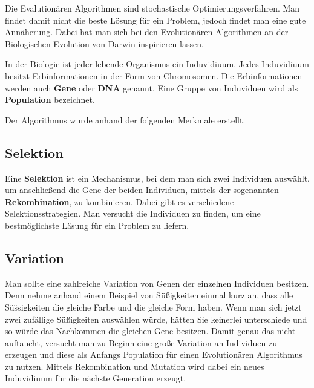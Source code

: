
Die Evalution{\"a}ren Algorithmen sind stochastische Optimierungsverfahren. Man findet damit nicht die beste L{\"o}sung f{\"u}r ein Problem, jedoch findet man eine gute Ann{\"a}herung.
Dabei hat man sich bei den Evolution{\"a}ren Algorithmen an der Biologischen Evolution von Darwin inspirieren lassen. \cite{selzam2003genetische}

In der Biologie ist jeder lebende Organismus ein Induvidiuum.
Jedes Induvidiuum besitzt Erbinformationen in der Form von Chromosomen. Die Erbinformationen werden auch \textbf{Gene} oder \textbf{DNA} genannt.
Eine Gruppe von Induviduen wird als \textbf{Population} bezeichnet.

Der Algorithmus wurde anhand der folgenden Merkmale erstellt.

\subsection{Selektion}
\label{ch:Grundlagen:sec:Taktile Ger{\"a}te:subsec:Selektion}

Eine \textbf{Selektion} ist ein Mechanismus, bei dem man sich zwei Individuen ausw{\"a}hlt, um anschlie{\ss}end die Gene der beiden Individuen, mittels der sogenannten \textbf{Rekombination}, zu kombinieren. Dabei gibt es verschiedene Selektionsstrategien. Man versucht die Individuen zu finden, um eine bestm{\"o}glichste L{\"a}sung f{\"u}r ein Problem zu liefern.

\subsection{Variation}
\label{ch:Grundlagen:sec:Taktile Geräte:subsec:Variation}

Man sollte eine zahlreiche Variation von Genen der einzelnen Individuen besitzen. 
Denn nehme anhand einem Beispiel von S{\"u}{\ss}igkeiten einmal kurz an, dass alle S{\"u}{\"ss}igkeiten die gleiche Farbe und die gleiche Form haben. Wenn man sich jetzt zwei zuf{\"a}llige S{\"u}{\ss}igkeiten ausw{\"a}hlen w{\"u}rde, h{\"a}tten Sie keinerlei unterschiede und so w{\"u}rde das Nachkommen die gleichen Gene besitzen. Damit genau das nicht auftaucht, versucht man zu Beginn eine gro{\ss}e Variation an Individuen zu erzeugen und diese als Anfangs Population f{\"u}r einen Evolution{\"a}ren Algorithmus zu nutzen. Mittels Rekombination und Mutation wird dabei ein neues Induvidiuum f{\"u}r die n{\"a}chste Generation erzeugt. 


